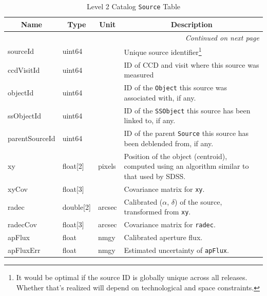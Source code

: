 \documentclass[12pt]{article}
\newcommand{\code}[1]{\texttt{#1}}
\newcommand{\Object}{\code{Object}\xspace}
\newcommand{\Source}{\code{Source}\xspace}
\newcommand{\SSObject}{\code{SSObject}\xspace}
\begin{document}
\begin{center}
\begin{longtable}{p{3cm}p{2cm}p{2cm}p{5cm}}
\caption[\Source Table]{Level 2 Catalog \Source Table
} \\

\hline \multicolumn{1}{c}{\bf Name} & \multicolumn{1}{c}{\bf Type} & \multicolumn{1}{c}{\bf Unit} & \multicolumn{1}{c}{\bf Description} \\ \hline
\endhead

\hline \multicolumn{4}{r}{{\em Continued on next page}} \\
\endfoot

\hline\hline
\endlastfoot

sourceId & uint64 & ~ & Unique source identifier\footnote{It would be optimal if the source ID is globally unique across all releases. Whether that's realized will depend on technological and space constraints.} \\

ccdVisitId & uint64 & ~ & ID of CCD and visit where this source was measured \\

objectId & uint64 & ~ & ID of the \Object this source was associated with, if any. \\

ssObjectId & uint64 & ~ & ID of the \SSObject this source has been linked to, if any. \\

parentSourceId & uint64 & ~ & ID of the parent \Source this source has been deblended from, if any. \\

xy & float[2] & pixels & Position of the object (centroid), computed using an algorithm similar to that used by SDSS.\\

xyCov & float[3] & ~ & Covariance matrix for {\tt xy}. \\

radec & double[2] & arcsec & Calibrated ($\alpha$, $\delta$) of the source, transformed from {\tt xy}.\\

radecCov & float[3] & arcsec & Covariance matrix for {\tt radec}. \\

apFlux & float & nmgy & Calibrated aperture flux. \\

apFluxErr & float & nmgy &  Estimated uncertainty of \texttt{apFlux}. \\


\end{longtable}
\end{center}
\end{document}
